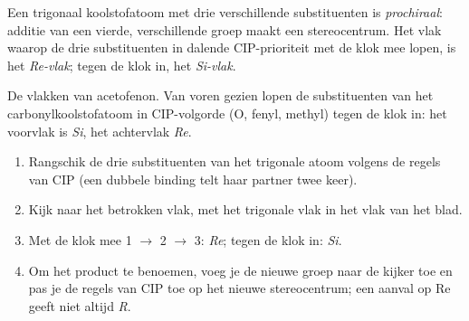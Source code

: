 \begin{definition}\label{def:b3:asymmetric-synthesis:faces}
Een trigonaal koolstofatoom met drie verschillende substituenten is
\emph{prochiraal}: additie van een vierde, verschillende
groep maakt een stereocentrum. Het vlak waarop de drie substituenten in
dalende CIP-prioriteit met de klok mee lopen, is het
\emph{Re-vlak}; tegen de klok in, het
\emph{Si-vlak}.
\end{definition}

\begin{omfigure}

{\small De vlakken van acetofenon. Van voren gezien lopen de substituenten
van het carbonylkoolstofatoom in CIP-volgorde (O, fenyl, methyl) tegen de
klok in: het voorvlak is \textit{Si}, het achtervlak \textit{Re}.}
\end{omfigure}

\begin{method}\label{met:b3:asymmetric-synthesis:re-si}
\begin{enumerate}
  \item Rangschik de drie substituenten van het trigonale atoom volgens de
        regels van CIP (een dubbele binding telt haar partner twee keer).
  \item Kijk naar het betrokken vlak, met het trigonale vlak in het vlak
        van het blad.
  \item Met de klok mee 1 $\to$ 2 $\to$ 3: \textit{Re}; tegen de klok in: \textit{Si}.
  \item Om het product te benoemen, voeg je de nieuwe groep naar de
        kijker toe en pas je de regels van CIP toe op het nieuwe
        stereocentrum; een aanval op Re geeft niet altijd \textit{R}.
\end{enumerate}
\end{method}


